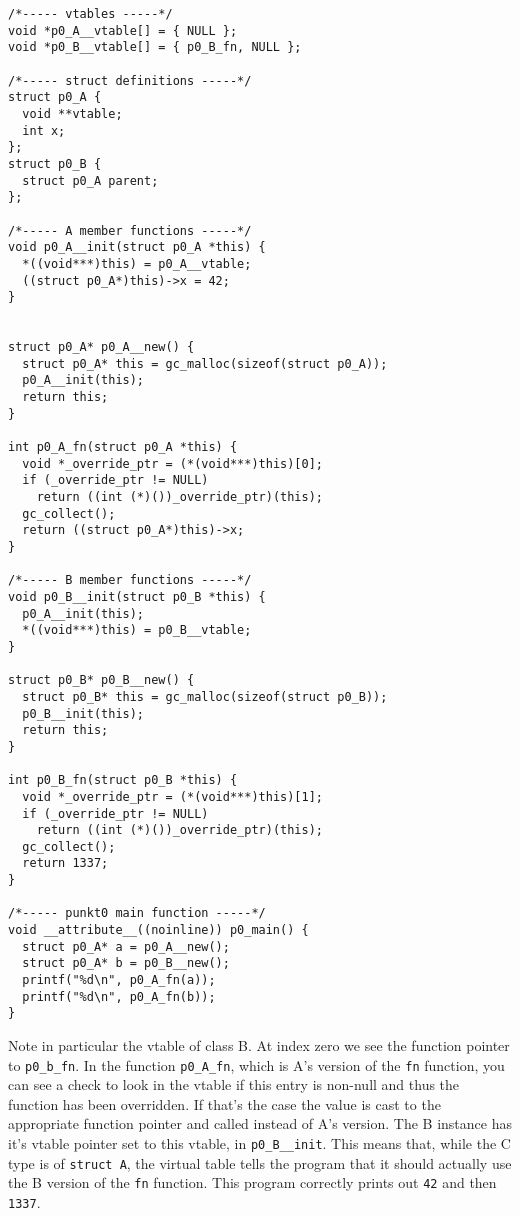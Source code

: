 \begin{lstlisting}
/*----- vtables -----*/
void *p0_A__vtable[] = { NULL };
void *p0_B__vtable[] = { p0_B_fn, NULL };

/*----- struct definitions -----*/
struct p0_A {
  void **vtable;
  int x;
};
struct p0_B {
  struct p0_A parent;
};

/*----- A member functions -----*/
void p0_A__init(struct p0_A *this) {
  *((void***)this) = p0_A__vtable;
  ((struct p0_A*)this)->x = 42;
}


struct p0_A* p0_A__new() {
  struct p0_A* this = gc_malloc(sizeof(struct p0_A));
  p0_A__init(this);
  return this;
}

int p0_A_fn(struct p0_A *this) {
  void *_override_ptr = (*(void***)this)[0];
  if (_override_ptr != NULL)
    return ((int (*)())_override_ptr)(this);
  gc_collect();
  return ((struct p0_A*)this)->x;
}

/*----- B member functions -----*/
void p0_B__init(struct p0_B *this) {
  p0_A__init(this);
  *((void***)this) = p0_B__vtable;
}

struct p0_B* p0_B__new() {
  struct p0_B* this = gc_malloc(sizeof(struct p0_B));
  p0_B__init(this);
  return this;
}

int p0_B_fn(struct p0_B *this) {
  void *_override_ptr = (*(void***)this)[1];
  if (_override_ptr != NULL)
    return ((int (*)())_override_ptr)(this);
  gc_collect();
  return 1337;
}

/*----- punkt0 main function -----*/
void __attribute__((noinline)) p0_main() {
  struct p0_A* a = p0_A__new();
  struct p0_A* b = p0_B__new();
  printf("%d\n", p0_A_fn(a));
  printf("%d\n", p0_A_fn(b));
}
\end{lstlisting}
Note in particular the vtable of class B. At index zero we see the function pointer to \texttt{p0\_b\_fn}. In the function \texttt{p0\_A\_fn}, which is A's version of the \texttt{fn} function, you can see a check to look in the vtable if this entry is non-null and thus the function has been overridden. If that's the case the value is cast to the appropriate function pointer and called instead of A's version. The B instance has it's vtable pointer set to this vtable, in \texttt{p0\_B\_\_init}. This means that, while the C type is of \texttt{struct A}, the virtual table tells the program that it should actually use the B version of the \texttt{fn} function. This program correctly prints out \texttt{42} and then \texttt{1337}.